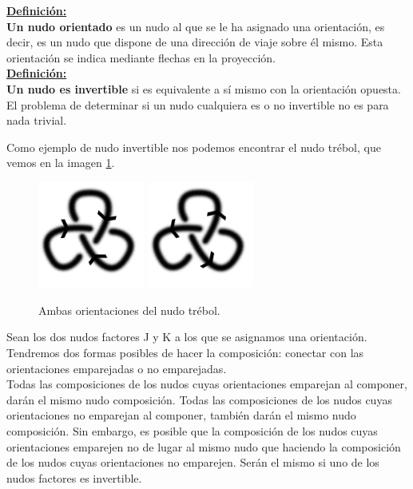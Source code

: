 \underline{\textbf{ Definición:}}\\
\textbf{ Un nudo orientado} es un nudo al que se le ha asignado una orientación, es decir, es un nudo que dispone de una dirección de viaje sobre él mismo. Esta orientación se indica mediante flechas en la proyección. \\

\underline{\textbf{ Definición:}}\\
\textbf{ Un nudo es invertible} si es equivalente a sí mismo con la orientación opuesta. \\

El problema de determinar si un nudo cualquiera es o no invertible no es para nada trivial.

Como ejemplo de nudo invertible nos podemos encontrar el nudo trébol, que vemos en la imagen \ref{comp5}.\\
\begin{figure}[h!]
	\includegraphics[width=3.5cm]{inudos/3fcon1.png}
	\includegraphics[width=3.5cm]{inudos/3fcon2.png}
	\centering
	\caption{Ambas orientaciones del nudo trébol.}
	\label{comp5} 
\end{figure}

Sean los dos nudos factores J y K a los que se asignamos una orientación. Tendremos dos formas posibles de hacer la composición: conectar con las orientaciones emparejadas o no emparejadas. \\
Todas las composiciones de los nudos cuyas orientaciones emparejan al componer, darán el mismo nudo composición. Todas las composiciones de los nudos cuyas orientaciones no emparejan al componer, también darán el mismo nudo composición. Sin embargo, es posible que la composición de los nudos cuyas orientaciones emparejen no de lugar al mismo nudo que haciendo la composición de los nudos cuyas orientaciones no emparejen. Serán el mismo si uno de los nudos factores es invertible.\\

